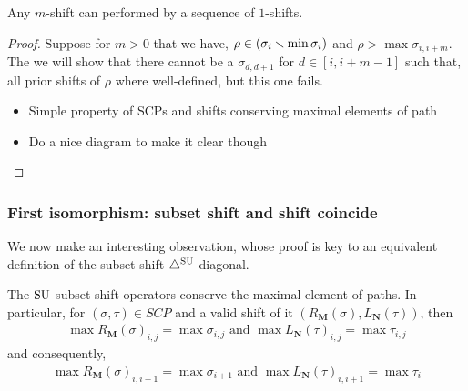 \begin{lemma}
Any $m$-shift can performed by a sequence of $1$-shifts.
\end{lemma}
\begin{proof}
Suppose for $m>0$ that we have, $\rho \in (\sigma_i \smallsetminus \min \sigma_i)$ and $\rho> \max \sigma_{i,i+m}$.
The we will show that there cannot be a $\sigma_{d,d+1}$ for $d\in [i,i+m-1]$ such that, all prior shifts of $\rho$ where well-defined, but this one fails.
\begin{itemize}
    \item Simple property of SCPs and shifts conserving maximal elements of path
    \item Do a nice diagram to make it clear though 
\end{itemize}
\end{proof}


\subsubsection{First isomorphism: subset shift and shift coincide}

We now make an interesting observation, whose proof is key to an equivalent definition of the subset shift $\triangle^{\mathrm{SU}}$ diagonal. 
\begin{lemma} \label{lem:SU subset conserves maximal element of paths}
The $\mathrm{SU}$ subset shift operators conserve the maximal element of paths.
In particular, for $(\sigma,\tau)\in SCP$ and a valid shift of it $(R_{\mathbf{M}}(\sigma),L_{\mathbf{N}}(\tau))$, then
\begin{align*}
    \max R_{\mathbf{M}}(\sigma)_{i,j} = \max \sigma_{i,j} \text{ and } \max L_{\mathbf{N}}(\tau)_{i,j} = \max \tau_{i,j}
\end{align*}
and consequently,
\begin{align*}
    \max R_{\mathbf{M}}(\sigma)_{i,i+1} = \max \sigma_{i+1} \text{ and } \max L_{\mathbf{N}}(\tau)_{i,i+1} = \max \tau_{i} 
\end{align*}
\end{lemma}

